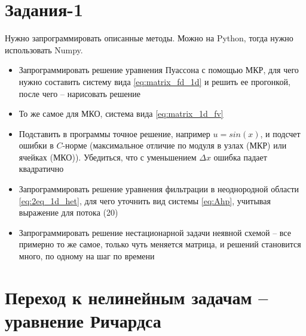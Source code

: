 \documentclass[a4paper, 11pt]{article}
\begin{document}
\section{Задания-1}
Нужно запрограммировать описанные методы. Можно на Python, тогда нужно использовать Numpy.
\begin{itemize}
	\item Запрограммировать решение уравнения Пуассона с помощью МКР, для чего нужно составить систему вида \eqref{eq:matrix_fd_1d} и решить ее прогонкой, после чего -- нарисовать решение
	\item То же самое для МКО, система вида \eqref{eq:matrix_1d_fv}
	\item Подставить в программы точное решение, например $u = sin(x)$, и подсчет ошибки в $C$-норме (максимальное отличие по модуля в узлах (МКР) или ячейках (МКО)). Убедиться, что с уменьшением $\Delta x$ ошибка падает квадратично
	\item Запрограммировать решение уравнения фильтрации в неоднородной области \eqref{eq:2eq_1d_het}, для чего уточнить вид системы \eqref{eq:Ahp}, учитывая выражение для потока (20)
	\item Запрограммировать решение нестационарной задачи неявной схемой -- все примерно то же самое, только чуть меняется матрица, и решений становится много, по одному на шаг по времени
\end{itemize}

\section{Переход к нелинейным задачам -- уравнение Ричардса}

\end{document}
